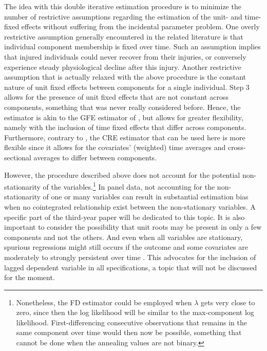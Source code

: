 \documentclass[11pt,letter]{article}
\begin{document}
The idea with this double iterative estimation procedure is to minimize the number of restrictive assumptions regarding the estimation of the unit- and time-fixed effects without suffering from the incidental parameter problem. One overly restrictive assumption generally encountered in the related literature is that individual component membership is fixed over time. Such an assumption implies that injured individuals could never recover from their injuries, or conversely experience steady physiological decline after this injury. Another restrictive assumption that is actually relaxed with the above procedure is the constant nature of unit fixed effects between components for a single individual. Step 3 allows for the presence of unit fixed effects that are not constant across components, something that was never really considered before. Hence, the estimator is akin to the GFE estimator of \cite{bonhomme_grouped_2015}, but allows for greater flexibility, namely with the inclusion of time fixed effects that differ across components. Furthermore, contrary to \cite{hyppolite_alternative_2017}, the CRE estimator that can be used here is more flexible since it allows for the covariates' (weighted) time averages and cross-sectional averages to differ between components.
\par
However, the procedure described above does not account for the potential non-stationarity of the variables.\footnote{Nonetheless, the FD estimator could be employed when $\lambda$ gets very close to zero, since then the log likelihood will be similar to the max-component log likelihood. First-differencing consecutive observations that remains in the same component over time would then now be possible, something that cannot be done when the annealing values are not binary.} In panel data, not accounting for the non-stationarity of one or many variables can result in substantial estimation bias when no cointegrated relationship exist between the non-stationary variables. A specific part of the third-year paper will be dedicated to this topic. It is also important to consider the possibility that unit roots may be present in only a few components and not the others. And even when all variables are stationary, spurious regressions might still occurs if the outcome and some covariates are moderately to strongly persistent over time \citep{granger_spurious_2001}. This advocates for the inclusion of lagged dependent variable in all specifications, a topic that will not be discussed for the moment.
\end{document}
